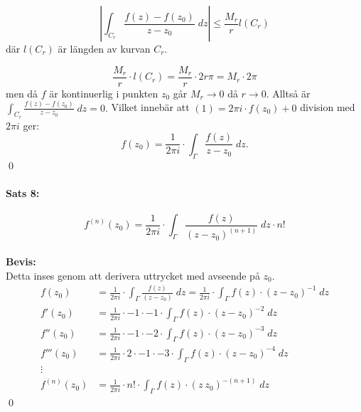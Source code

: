 \documentclass{article}%
\begin{document}
\[
	\left | \int_{C_r} \frac {f(z) - f(z_0)} {z - z_0} \; dz \right | \leq \frac {M_r} {r} l(C_r)
\]
där $l(C_r)$ är längden av kurvan $C_r$.

\[
\frac {M_r} {r} \cdot l(C_r) = \frac {M_r} {r} \cdot 2r\pi = M_r \cdot 2 \pi
\]
men då $f$ är kontinuerlig i punkten $z_0$ går $M_r \rightarrow 0$ då $r \rightarrow 0$.
Alltså är $\int_{C_r} \frac {f(z) - f(z_0)} {z - z_0} \; dz = 0.$ Vilket innebär att $(1) = 2\pi i \cdot f(z_0) + 0$
division med $2\pi i$ ger:
\[
	f(z_0) = \frac {1} {2 \pi i} \cdot \int_{\Gamma} \frac {f(z)} {z - z_0} \; dz.
\]
\hfill \qed
\\

\paragraph{Sats 8:}
\[
	f^{(n)}(z_0) = \frac {1} {2 \pi i} \cdot \int_{\Gamma} \frac {f(z)} {(z - z_0)^{(n + 1)}} \; dz \cdot n!
\]
\\
{\bf Bevis:}\\
Detta inses genom att derivera uttrycket med avseende på $z_0$.
\begin{align*}
	f(z_0) &= \frac {1} {2 \pi i} \cdot \int_{\Gamma} \frac {f(z)} {(z - z_0)} \; dz = \frac {1} {2 \pi i} \cdot \int_{\Gamma}
		f(z) \cdot (z - z_0)^{-1} \; dz \\
	f'(z_0) &= \frac {1} {2 \pi i} \cdot -1 \cdot -1 \cdot \int_{\Gamma} f(z) \cdot (z - z_0)^{-2} \; dz \\
	f''(z_0) &= \frac {1} {2 \pi i} \cdot -1 \cdot -2 \cdot \int_{\Gamma} f(z) \cdot (z - z_0)^{-3} \; dz \\
	f'''(z_0) &= \frac {1} {2 \pi i} \cdot 2 \cdot -1 \cdot -3 \cdot \int_{\Gamma} f(z) \cdot (z - z_0)^{-4} \; dz \\
	\vdots \\
	f^{(n)}(z_0) &= \frac {1} {2 \pi i} \cdot n! \cdot \int_\Gamma f(z) \cdot (z \ z_0)^{-(n + 1)} \; dz
\end{align*} %
\hfill \qed
\\
\end{document}
